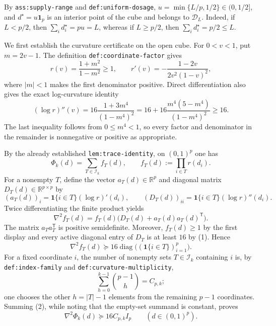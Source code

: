 By \texttt{ass:supply-range} and \texttt{def:uniform-dosage},
\(u=\min\{L/p,1/2\}\in(0,1/2]\), and \(d^\star=u\mathbf 1_p\) is an interior point of the cube and belongs to \(\mathcal D_L\).  Indeed, if \(L<p/2\), then \(\sum_i d_i^\star=pu=L\), whereas if \(L\ge p/2\), then \(\sum_i d_i^\star=p/2\le L\).

We first establish the curvature certificate on the open cube.  For \(0<v<1\), put \(m=2v-1\).  The definition \texttt{def:coordinate-factor} gives
\[
 r(v)=\frac{1+m^2}{1-m^2}\ge 1,
\qquad
 r'(v)=-\frac{1-2v}{2v^2(1-v)^2},
\]
where \(|m|<1\) makes the first denominator positive.  Direct differentiation also gives the exact log-curvature identity
\[
 (\log r)''(v)
 =16\frac{1+3m^4}{(1-m^4)^2}
 =16+16\frac{m^4(5-m^4)}{(1-m^4)^2}
 \ge 16. \tag{1}
\]
The last inequality follows from \(0\le m^4<1\), so every factor and denominator in the remainder is nonnegative or positive as appropriate.

By the already established \texttt{lem:trace-identity}, on \((0,1)^p\) one has
\[
 \Phi_k(d)=\sum_{T\in\mathcal I_k} f_T(d),
 \qquad
 f_T(d):=\prod_{i\in T}r(d_i).
\]
For a nonempty \(T\), define the vector \(a_T(d)\in\mathbb R^p\) and diagonal matrix \(D_T(d)\in\mathbb R^{p\times p}\) by
\[
 (a_T(d))_i=\mathbf 1\{i\in T\}(\log r)'(d_i),
 \qquad
 (D_T(d))_{ii}=\mathbf 1\{i\in T\}(\log r)''(d_i).
\]
Twice differentiating the finite product yields
\[
 \nabla^2 f_T(d)
 =f_T(d)\bigl(D_T(d)+a_T(d)a_T(d)^{\mathsf T}\bigr).
\]
The matrix \(a_Ta_T^{\mathsf T}\) is positive semidefinite.  Moreover, \(f_T(d)\ge1\) by the first display and every active diagonal entry of \(D_T\) is at least \(16\) by (1).  Hence
\[
 \nabla^2 f_T(d)\succeq
 16\operatorname{diag}\bigl((\mathbf 1\{i\in T\})_{i=1}^p\bigr). \tag{2}
\]
For a fixed coordinate \(i\), the number of nonempty sets \(T\in\mathcal I_k\) containing \(i\) is, by \texttt{def:index-family} and \texttt{def:curvature-multiplicity},
\[
 \sum_{h=0}^{k-1}\binom{p-1}{h}=C_{p,k};
\]
one chooses the other \(h=|T|-1\) elements from the remaining \(p-1\) coordinates.  Summing (2), while noting that the empty-set summand is constant, proves
\[
 \nabla^2\Phi_k(d)\succeq16C_{p,k}I_p
 \qquad(d\in(0,1)^p). \tag{3}
\]

